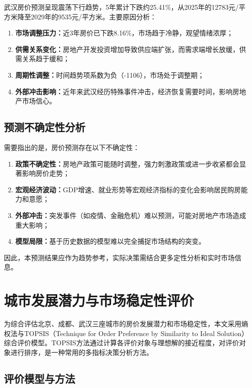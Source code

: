 \documentclass[12pt,a4paper]{article}
\begin{document}
武汉房价预测呈现震荡下行趋势，5年累计下跌约25.41\%，从2025年的12783元/平方米降至2029年的9535元/平方米。主要原因分析：
\begin{enumerate}
    \item \textbf{市场调整压力：}近3年房价已下跌8.16\%，市场趋于冷静，观望情绪浓厚；
    \item \textbf{供需关系变化：}房地产开发投资增加导致供应端扩张，而需求端增长放缓，供需关系趋于缓和；
    \item \textbf{周期性调整：}时间趋势项系数为负（-1106），市场处于调整期；
    \item \textbf{外部冲击影响：}近年来武汉经历特殊事件冲击，经济恢复需要时间，影响房地产市场信心。
\end{enumerate}

\subsection{预测不确定性分析}

需要指出的是，房价预测存在以下不确定性：
\begin{enumerate}
    \item \textbf{政策不确定性：}房地产政策可能随时调整，强力刺激政策或进一步收紧都会显著影响房价走势；
    \item \textbf{宏观经济波动：}GDP增速、就业形势等宏观经济指标的变化会影响居民购房能力和意愿；
    \item \textbf{外部冲击：}突发事件（如疫情、金融危机）难以预测，可能对房地产市场造成重大影响；
    \item \textbf{模型局限：}基于历史数据的模型难以完全捕捉市场结构的突变。
\end{enumerate}

因此，本预测结果应作为趋势参考，实际决策需结合更多定性分析和实时市场信息。

\section{城市发展潜力与市场稳定性评价}

为综合评估北京、成都、武汉三座城市的房价发展潜力和市场稳定性，本文采用熵权法与TOPSIS（Technique for Order Preference by Similarity to Ideal Solution）综合评价模型。TOPSIS方法通过计算各评价对象与理想解的接近程度，对评价对象进行排序，是一种常用的多指标决策分析方法。

\subsection{评价模型与方法}
\end{document}
